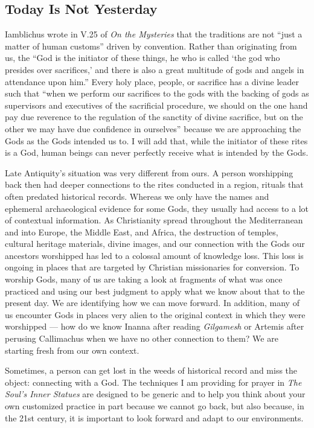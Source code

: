 \documentclass[
]{book}
\begin{document}
\hypertarget{today-is-not-yesterday}{%
\subsection{Today Is Not Yesterday}\label{today-is-not-yesterday}}

Iamblichus wrote in V.25 of \emph{On the Mysteries} that the traditions are not ``just a matter of human customs'' driven by convention. Rather than originating from us, the ``God is the initiator of these things, he who is called `the god who presides over sacrifices,' and there is also a great multitude of gods and angels in attendance upon him.'' Every holy place, people, or sacrifice has a divine leader such that ``when we perform our sacrifices to the gods with the backing of gods as supervisors and executives of the sacrificial procedure, we should on the one hand pay due reverence to the regulation of the sanctity of divine sacrifice, but on the other we may have due confidence in ourselves'' because we are approaching the Gods as the Gods intended us to. I will add that, while the initiator of these rites is a God, human beings can never perfectly receive what is intended by the Gods.

Late Antiquity's situation was very different from ours. A person worshipping back then had deeper connections to the rites conducted in a region, rituals that often predated historical records. Whereas we only have the names and ephemeral archaeological evidence for some Gods, they usually had access to a lot of contextual information. As Christianity spread throughout the Mediterranean and into Europe, the Middle East, and Africa, the destruction of temples, cultural heritage materials, divine images, and our connection with the Gods our ancestors worshipped has led to a colossal amount of knowledge loss. This loss is ongoing in places that are targeted by Christian missionaries for conversion. To worship Gods, many of us are taking a look at fragments of what was once practiced and using our best judgment to apply what we know about that to the present day. We are identifying how we can move forward. In addition, many of us encounter Gods in places very alien to the original context in which they were worshipped --- how do we know Inanna after reading \emph{Gilgamesh} or Artemis after perusing Callimachus when we have no other connection to them? We are starting fresh from our own context.

Sometimes, a person can get lost in the weeds of historical record and miss the object: connecting with a God. The techniques I am providing for prayer in \emph{The Soul's Inner Statues} are designed to be generic and to help you think about your own customized practice in part because we cannot go back, but also because, in the 21st century, it is important to look forward and adapt to our environments.
\end{document}
